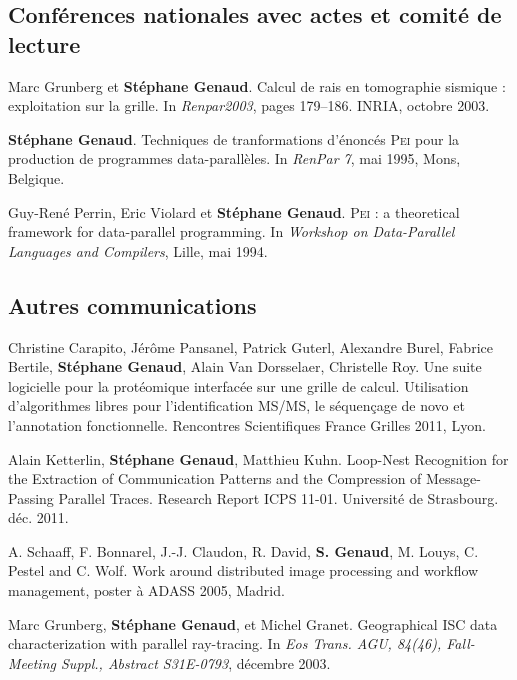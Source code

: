 \documentclass[11pt]{article}
\begin{document}
\begin{thebibliography}{99}
\subsection*{Conférences nationales avec actes et comité de lecture}
Marc Grunberg et \textbf{Stéphane Genaud}.
\newblock Calcul de rais en tomographie sismique : exploitation sur la grille.
\newblock In {\em Renpar2003}, pages 179--186. INRIA, octobre 2003.

\textbf{Stéphane Genaud}.
\newblock Techniques de tranformations d'énoncés \textsc{Pei} pour la
  production de programmes data-parallèles.
\newblock In {\em RenPar 7}, mai 1995, Mons, Belgique.

Guy-René Perrin, Eric Violard et \textbf{Stéphane Genaud}.
\newblock \textsc{Pei} : a theoretical framework for data-parallel programming.
\newblock In {\em Workshop on Data-Parallel Languages and Compilers}, Lille, 
mai 1994.
\vspace{3mm}


\subsection*{Autres communications}

Christine Carapito, Jérôme Pansanel, Patrick Guterl, Alexandre Burel, Fabrice 
Bertile, \textbf{Stéphane Genaud}, Alain Van Dorsselaer, Christelle Roy.
\newblock Une suite logicielle pour la protéomique interfacée sur une grille de 
calcul. Utilisation d'algorithmes libres pour l'identification MS/MS, le 
séquençage de novo et l'annotation fonctionnelle.
\newblock Rencontres Scientifiques France Grilles 2011, Lyon.


Alain Ketterlin, \textbf{Stéphane Genaud}, Matthieu Kuhn.
\newblock Loop-Nest Recognition for the Extraction of Communication Patterns 
and the Compression of Message-Passing Parallel Traces.
\newblock Research Report ICPS 11-01. Université de Strasbourg. déc. 2011.


A. Schaaff, F. Bonnarel, J.-J. Claudon, R. David, \textbf{S. Genaud}, M. Louys, 
C. Pestel and C. Wolf.
\newblock Work around distributed image processing and workflow management, 
\newblock poster à ADASS 2005, Madrid.


Marc Grunberg, \textbf{Stéphane Genaud}, et Michel Granet.
\newblock Geographical {ISC} data characterization with parallel ray-tracing.
\newblock In {\em Eos Trans. AGU, 84(46), Fall-Meeting Suppl., Abstract
  S31E-0793}, décembre 2003.


\end{thebibliography}
\end{document}
